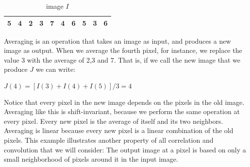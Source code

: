 \documentclass{report}
\begin{document}
\begin{table}[ht]
\centering
\label{my-label}
\begin{tabular}{|l|l|l|l|l|l|l|l|l|l|}
\hline
5 & 4 & 2 & 3 & 7 & 4 & 6 & 5 & 3 & 6 \\ \hline
\end{tabular}
\caption{image $I$}
\end{table}

Averaging is an operation that takes an image as input, and produces a new image as output. When we average the fourth pixel, for instance, we replace the value 3 with the average of 2,3 and 7. That is, if we call the new image that we produce $J$ we can write:\newline
    \centerline{$J(4) = [I(3)+I(4)+I(5)]/3 = 4$}\newline
Notice that every pixel in the new image depends on the pixels in the old image. Averaging like this is shift-invariant, because we perform the same operation at every pixel. Every new pixel is the average of itself and its two neighbors. Averaging is linear because every new pixel is a linear combination of the old pixels. This example illustrates another property of all correlation and convolution that we will consider: The output image at a pixel is based on only a small neighborhood of pixels around it in the input image.
\end{document}
